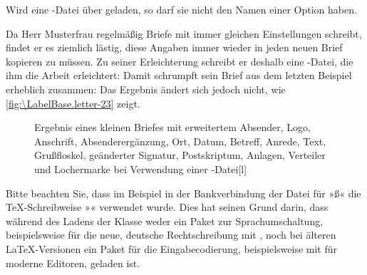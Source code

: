 Wird eine -Datei über
 geladen, so darf sie nicht den Namen einer Option
haben.

\begin{Example}
  Da Herr Musterfrau regelmäßig Briefe mit immer gleichen Einstellungen
  schreibt, findet er es ziemlich lästig, diese Angaben immer wieder in jeden
  neuen Brief kopieren zu müssen. Zu seiner Erleichterung schreibt er deshalb
  eine -Datei, die ihm die Arbeit erleichtert:%
  Damit schrumpft sein Brief aus dem letzten Beispiel erheblich zusammen:
  Das Ergebnis ändert sich jedoch nicht, wie \autoref{fig:\LabelBase.letter-23}
  zeigt.
  \begin{figure}
    \setcapindent{0pt}%
    \begin{captionbeside}{Ergebnis eines
        kleinen Briefes mit erweitertem Absender, Logo, Anschrift,
        Absenderergänzung, Ort, Datum, Betreff, Anrede, Text, Grußfloskel,
        geänderter Signatur, Postskriptum, Anlagen, Verteiler und Lochermarke
        bei Verwendung einer -Datei}[l]
    \end{captionbeside}
    \label{fig:\LabelBase.letter-23}
  \end{figure}
\end{Example}

Bitte beachten Sie, dass im Beispiel in der Bankverbindung
der Datei  für »ß« die \TeX-Schreibweise »« verwendet
wurde. Dies hat seinen Grund darin, dass während des Ladens der Klasse weder
ein Paket zur Sprachumschaltung, beispielsweise für die neue, deutsche
Rechtschreibung mit ,
noch bei älteren \LaTeX-Versionen ein Paket für die Eingabecodierung,
beispielsweise mit 
für moderne Editoren, geladen ist.

